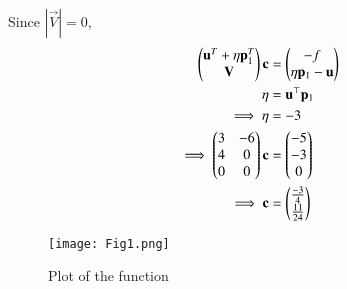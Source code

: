 \documentclass[journal,12pt,twocolumn]{IEEEtran}
\begin{document}
Since $|\vec{V}| = 0$,
\begin{align}
    \begin{pmatrix}\mathbf{u}^T+\eta \mathbf{p}_1^T \\ \mathbf{V}\end{pmatrix}\mathbf{c} &= \begin{pmatrix}-f \\ \eta \mathbf{p}_1-\mathbf{u}\end{pmatrix}\\
    \eta &= \mathbf{u}^\top \mathbf{p}_1\\
    \implies \eta &= -3\\
    \implies \begin{pmatrix}3 & -6 \\ 4 & 0 \\ 0 & 0\end{pmatrix}\mathbf{c} &= \begin{pmatrix}-5 \\ -3 \\ 0\end{pmatrix}\\
    \implies \mathbf{c} &= \begin{pmatrix}\frac{-3}{4}\\\frac{11}{24}\end{pmatrix}
\end{align}
\begin{figure}[htp]
    \centering
    \texttt{[image: Fig1.png]}
    \caption{Plot of the function}
    \label{fig:plot}
\end{figure}
\end{document}
